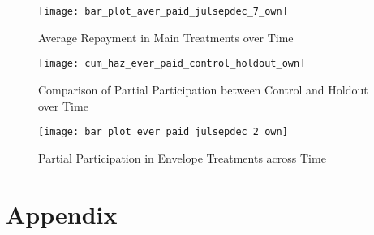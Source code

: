 \documentclass[12pt,titlepage]{article}
\begin{document}
\begin{figure}[htpb]
\begin{center}
\caption{Average Repayment in Main Treatments over Time}
\label{fig:tp_time_7_own}
\bigskip
\texttt{[image: bar\_plot\_aver\_paid\_julsepdec\_7\_own]}
\end{center}
\end{figure}

\begin{figure}[htpb]
\begin{center}
\caption{Comparison of Partial Participation between Control and Holdout over Time}
\label{fig:ep_time_ch_own}
\bigskip
\texttt{[image: cum\_haz\_ever\_paid\_control\_holdout\_own]}
\end{center}
\end{figure}

\begin{figure}[htpb]
\begin{center}
\caption{Partial Participation in Envelope Treatments across Time}
\label{fig:ep_time_2_own}
\bigskip
\texttt{[image: bar\_plot\_ever\_paid\_julsepdec\_2\_own]}
\end{center}
\end{figure}

\section{Appendix}

\end{document}
